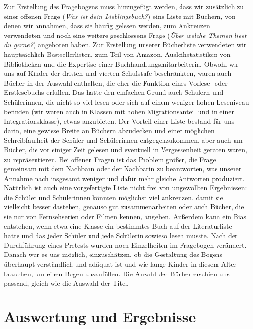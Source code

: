 Zur Erstellung des Fragebogens muss hinzugefügt werden, dass wir
zusätzlich zu einer offenen Frage (\emph{Was ist dein Lieblingsbuch?})
eine Liste mit Büchern, von denen wir annahmen, dass sie häufig gelesen
werden, zum Ankreuzen verwendeten und noch eine weitere geschlossene
Frage (\emph{Über welche Themen liest du gerne?}) angeboten haben. Zur
Erstellung unserer Bücherliste verwendeten wir hauptsächlich
Bestsellerlisten, zum Teil von Amazon, Ausleihstatistiken von
Bibliotheken und die Expertise einer Buchhandlungsmitarbeiterin. Obwohl
wir uns auf Kinder der dritten und vierten Schulstufe beschränkten,
waren auch Bücher in der Auswahl enthalten, die eher die Funktion eines
Vorlese- oder Erstlesebuchs erfüllen. Das hatte den einfachen Grund auch
Schülern und Schülerinnen, die nicht so viel lesen oder sich auf einem
weniger hohen Leseniveau befinden (wir waren auch in Klassen mit hohen
Migrationsanteil und in einer Integrationsklasse), etwas anzubieten. Der
Vorteil einer Liste bestand für uns darin, eine gewisse Breite an
Büchern abzudecken und einer möglichen Schreibfaulheit der Schüler und
Schülerinnen entgegenzukommen, aber auch um Bücher, die vor einiger Zeit
gelesen und eventuell in Vergessenheit geraten waren, zu repräsentieren.
Bei offenen Fragen ist das Problem größer, die Frage gemeinsam mit dem
Nachbarn oder der Nachbarin zu beantworten, was unserer Annahme nach
insgesamt weniger und dafür mehr gleiche Antworten produziert. Natürlich
ist auch eine vorgefertigte Liste nicht frei von ungewollten
Ergebnissen: die Schüler und Schülerinnen könnten möglichst viel
ankreuzen, damit sie vielleicht besser dastehen, genauso gut
zusammenarbeiten oder auch Bücher, die sie nur von Fernsehserien oder
Filmen kennen, angeben. Außerdem kann ein Bias entstehen, wenn etwa eine
Klasse ein bestimmtes Buch auf der Literaturliste hatte und das jeder
Schüler und jede Schülerin sowieso lesen musste. Nach der Durchführung
eines Pretests wurden noch Einzelheiten im Fragebogen verändert. Danach
war es uns möglich, einzuschätzen, ob die Gestaltung des Bogens
überhaupt verständlich und adäquat ist und wie lange Kinder in diesem
Alter brauchen, um einen Bogen auszufüllen. Die Anzahl der Bücher
erschien uns passend, gleich wie die Auswahl der Titel.

\section{Auswertung und Ergebnisse}

